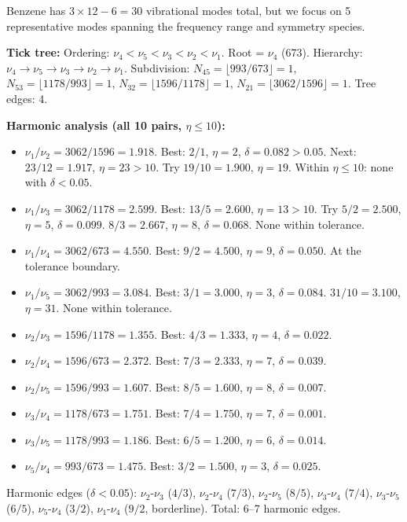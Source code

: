 \documentclass[11pt,a4paper]{article}
\theoremstyle{definition}
\theoremstyle{remark}
\begin{document}
Benzene has $3 \times 12 - 6 = 30$ vibrational modes total, but we focus on 5 representative modes spanning the frequency range and symmetry species.

\textbf{Tick tree:} Ordering: $\nu_4 < \nu_5 < \nu_3 < \nu_2 < \nu_1$. Root = $\nu_4$ (673). Hierarchy: $\nu_4 \to \nu_5 \to \nu_3 \to \nu_2 \to \nu_1$. Subdivision: $N_{45} = \lfloor 993/673 \rfloor = 1$, $N_{53} = \lfloor 1178/993 \rfloor = 1$, $N_{32} = \lfloor 1596/1178 \rfloor = 1$, $N_{21} = \lfloor 3062/1596 \rfloor = 1$. Tree edges: 4.

\textbf{Harmonic analysis (all 10 pairs, $\eta \leq 10$):}

\begin{itemize}[nosep]
\item $\nu_1/\nu_2 = 3062/1596 = 1.918$. Best: $2/1$, $\eta = 2$, $\delta = 0.082 > 0.05$. Next: $23/12 = 1.917$, $\eta = 23 > 10$. Try $19/10 = 1.900$, $\eta = 19$. Within $\eta \leq 10$: none with $\delta < 0.05$.
\item $\nu_1/\nu_3 = 3062/1178 = 2.599$. Best: $13/5 = 2.600$, $\eta = 13 > 10$. Try $5/2 = 2.500$, $\eta = 5$, $\delta = 0.099$. $8/3 = 2.667$, $\eta = 8$, $\delta = 0.068$. None within tolerance.
\item $\nu_1/\nu_4 = 3062/673 = 4.550$. Best: $9/2 = 4.500$, $\eta = 9$, $\delta = 0.050$. At the tolerance boundary.
\item $\nu_1/\nu_5 = 3062/993 = 3.084$. Best: $3/1 = 3.000$, $\eta = 3$, $\delta = 0.084$. $31/10 = 3.100$, $\eta = 31$. None within tolerance.
\item $\nu_2/\nu_3 = 1596/1178 = 1.355$. Best: $4/3 = 1.333$, $\eta = 4$, $\delta = 0.022$.
\item $\nu_2/\nu_4 = 1596/673 = 2.372$. Best: $7/3 = 2.333$, $\eta = 7$, $\delta = 0.039$.
\item $\nu_2/\nu_5 = 1596/993 = 1.607$. Best: $8/5 = 1.600$, $\eta = 8$, $\delta = 0.007$.
\item $\nu_3/\nu_4 = 1178/673 = 1.751$. Best: $7/4 = 1.750$, $\eta = 7$, $\delta = 0.001$.
\item $\nu_3/\nu_5 = 1178/993 = 1.186$. Best: $6/5 = 1.200$, $\eta = 6$, $\delta = 0.014$.
\item $\nu_5/\nu_4 = 993/673 = 1.475$. Best: $3/2 = 1.500$, $\eta = 3$, $\delta = 0.025$.
\end{itemize}

Harmonic edges ($\delta < 0.05$): $\nu_2$-$\nu_3$ ($4/3$), $\nu_2$-$\nu_4$ ($7/3$), $\nu_2$-$\nu_5$ ($8/5$), $\nu_3$-$\nu_4$ ($7/4$), $\nu_3$-$\nu_5$ ($6/5$), $\nu_5$-$\nu_4$ ($3/2$), $\nu_1$-$\nu_4$ ($9/2$, borderline). Total: 6--7 harmonic edges.
\end{document}
